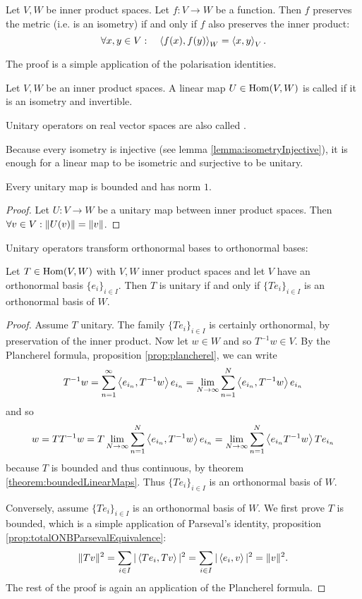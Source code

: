 \begin{lemma}
Let $V,W$ be inner product spaces. Let $f:V\to W$ be a function. Then $f$ preserves the metric (i.e. is an isometry) \textup{if and only if} $f$ also preserves the inner product:
\[ \forall x,y \in V: \quad \left\langle f(x),f(y) \right\rangle_W = \left\langle x,y \right\rangle_V. \]
\end{lemma}
The proof is a simple application of the polarisation identities.

\begin{definition}
Let $V,W$ be an inner product spaces. A linear map $U\in\operatorname{Hom}(V,W)$ is called  if it is an isometry and invertible.

Unitary operators on real vector spaces are also called .
\end{definition}
Because every isometry is injective (see lemma \ref{lemma:isometryInjective}), it is enough for a linear map to be isometric and surjective to be unitary.

\begin{lemma}
Every unitary map is bounded and has norm $1$.
\end{lemma}
\begin{proof}
Let $U: V\to W$ be a unitary map between inner product spaces. Then $\forall v\in V: \lVert U(v)\rVert = \lVert v\rVert$.
\end{proof}

Unitary operators transform orthonormal bases to orthonormal bases:
\begin{proposition}
Let $T\in \operatorname{Hom}(V,W)$ with $V,W$ inner product spaces and let $V$ have an orthonormal basis $\{e_i\}_{i\in I}$. Then $T$ is unitary \textup{if and only if} $\{Te_i\}_{i\in I}$ is an orthonormal basis of $W$.
\end{proposition}
\begin{proof}
Assume $T$ unitary. The family $\{Te_i\}_{i\in I}$ is certainly orthonormal, by preservation of the inner product. Now let $w\in W$ and so $T^{-1}w\in V$. By the Plancherel formula, proposition \ref{prop:plancherel}, we can write
\[ T^{-1}w = \sum_{n=1}^\infty \left\langle e_{i_n},T^{-1}w \right\rangle e_{i_n} = \lim_{N\to\infty}\sum_{n=1}^N \left\langle e_{i_n},T^{-1}w \right\rangle e_{i_n} \]
and so
\[ w = TT^{-1}w = T\lim_{N\to\infty}\sum_{n=1}^N \left\langle e_{i_n},T^{-1}w \right\rangle e_{i_n} = \lim_{N\to\infty}\sum_{n=1}^N \left\langle e_{i_n}T^{-1}w \right\rangle Te_{i_n} \]
because $T$ is bounded and thus continuous, by theorem \ref{theorem:boundedLinearMaps}.
Thus $\{Te_i\}_{i\in I}$ is an orthonormal basis of $W$.

Conversely, assume $\{Te_i\}_{i\in I}$ is an orthonormal basis of $W$. We first prove $T$ is bounded, which is a simple application of Parseval's identity, proposition \ref{prop:totalONBParsevalEquivalence}:
\[ \lVert Tv\rVert^2 = \sum_{i\in I}|\left\langle Te_i,Tv \right\rangle|^2 = \sum_{i\in I}|\left\langle e_i,v \right\rangle|^2 = \lVert v\rVert^2. \]
The rest of the proof is again an application of the Plancherel formula.
\end{proof}

